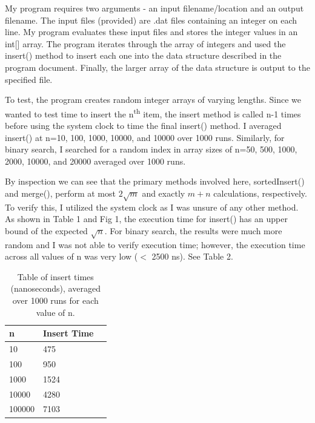 \documentclass[11pt]{article}
\begin{document}
My program requires two arguments - an input filename/location and an output filename. The input files (provided) are .dat files containing an integer on each line. My program evaluates these input files and stores the integer values in an int[] array. The program iterates through the array of integers and used the insert() method to insert each one into the data structure described in the program document. Finally, the larger array of the data structure is output to the specified file.

To test, the program creates random integer arrays of varying lengths. Since we wanted to test time to insert the n\textsuperscript{th} item, the insert method is called n-1 times before using the system clock to time the final insert() method. I averaged insert() at n=10, 100, 1000, 10000, and 10000 over 1000 runs. Similarly, for binary search, I searched for a random index in array sizes of n=50, 500, 1000, 2000, 10000, and 20000 averaged over 1000 runs.

By inspection we can see that the primary methods involved here, sortedInsert() and merge(), perform at most $2\sqrt{m}$ and exactly $m+n$ calculations, respectively. To verify this, I utilized the system clock as I was unsure of any other method. As shown in Table 1 and Fig 1, the execution time for insert() has an upper bound of the expected $\sqrt{n}$. For binary search, the results were much more random and I was not able to verify execution time; however, the execution time across all values of n was very low ($<$ 2500 ns). See Table 2.


\begin{table}[!htbp]
\centering
\begin{tabular}{l|ll}
\textbf{n} & \textbf{Insert Time} \\ \hline
10                         & 475                  \\
100                        & 950                 \\
1000                      & 1524                 \\
10000                      & 4280                 \\
100000                     & 7103                               
\end{tabular}
\caption{Table of insert times (nanoseconds), averaged over 1000 runs for each value of n.}
\end{table}
\end{document}
